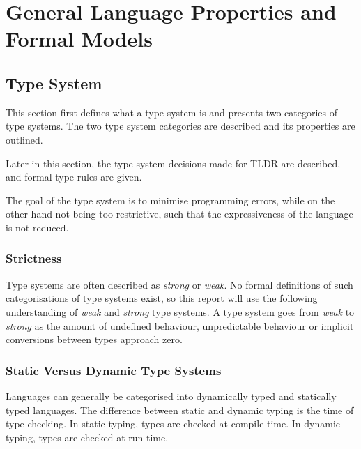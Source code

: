 \section{General Language Properties and Formal Models}


\subsection{Type System}\label{typesys}

This section first defines what a type system is and presents two categories of type systems. The two type system categories are described and its properties are outlined.

Later in this section, the type system decisions made for TLDR are described, and formal type rules are given.


The goal of the type system is to minimise programming errors, while on the other hand not being too restrictive, such that the expressiveness of the language is not reduced. 

\subsubsection{Strictness}
Type systems are often described as \emph{strong} or \emph{weak}. No formal definitions of such categorisations of type systems exist, so this report will use the following understanding of \emph{weak} and \emph{strong} type systems. A type system goes from \emph{weak} to \emph{strong} as the amount of undefined behaviour, unpredictable behaviour or implicit conversions between types approach zero.

\subsubsection{Static Versus Dynamic Type Systems}
Languages can generally be categorised into dynamically typed and statically typed languages. The difference between static and dynamic typing is the time of type checking. In static typing, types are checked at compile time. In dynamic typing, types are checked at run-time.

